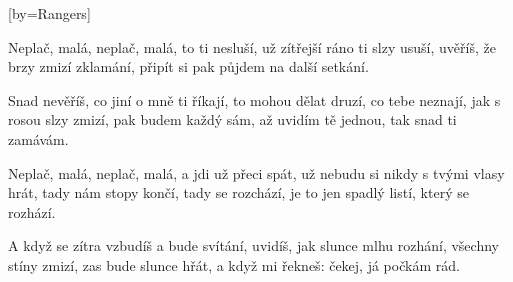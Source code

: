 [by={Rangers}]

\beginverse{}
Neplač, malá, neplač, malá, to ti nesluší,
už zítřejší ráno ti slzy usuší,
uvěříš, že brzy zmizí zklamání,
připít si pak půjdem na další setkání.
\endverse{}

\beginverse{}
Snad nevěříš, co jiní o mně ti říkají,
to mohou dělat druzí, co tebe neznají,
jak s rosou slzy zmizí, pak budem každý sám,
až uvidím tě jednou, tak snad ti zamávám.
\endverse{}

\beginverse{}
Neplač, malá, neplač, malá, a jdi už přeci spát,
už nebudu si nikdy s tvými vlasy hrát,
tady nám stopy končí, tady se rozchází,
je to jen spadlý listí, který se rozhází.
\endverse{}

\beginverse{}
A když se zítra vzbudíš a bude svítání,
uvidíš, jak slunce mlhu rozhání,
všechny stíny zmizí, zas bude slunce hřát,
a když mi řekneš: čekej, já počkám rád.
\endverse{}

\endsong{}
